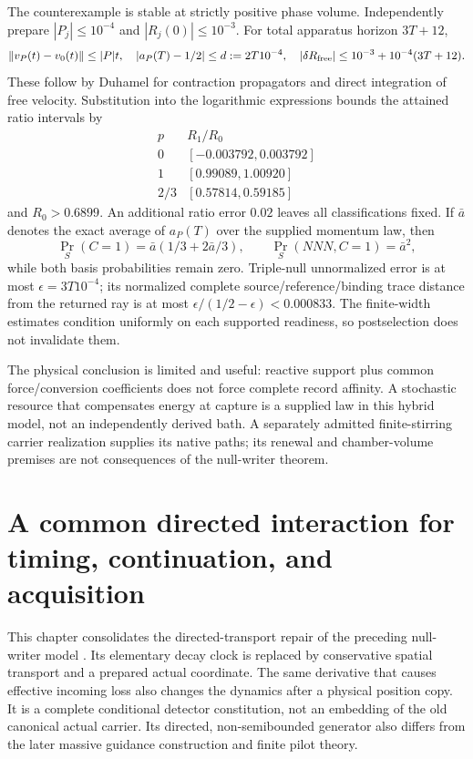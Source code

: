 \documentclass[11pt,oneside,openany]{book}
\theoremstyle{definition}
\theoremstyle{remark}\newtheorem{remark}[theorem]{Remark}
\begin{document}
The counterexample is stable at strictly positive phase volume. Independently prepare $|P_j|\le10^{-4}$ and $|R_j(0)|\le10^{-3}$. For total apparatus horizon $3T+12$,
\[
 \|v_P(t)-v_0(t)\|\le|P|t,\quad
 |a_P(T)-1/2|\le d:=2T10^{-4},\quad
 |\delta R_{\rm free}|\le10^{-3}+10^{-4}(3T+12).
\]
These follow by Duhamel for contraction propagators and direct integration of free velocity. Substitution into the logarithmic expressions bounds the attained ratio intervals by
\[
 \begin{array}{c|c}
 p& R_1/R_0\\\hline
 0&[-0.003792,0.003792]\\
 1&[0.99089,1.00920]\\
 2/3&[0.57814,0.59185]
 \end{array}
\]
and $R_0>0.6899$. An additional ratio error $0.02$ leaves all classifications fixed. If $\bar a$ denotes the exact average of $a_P(T)$ over the supplied momentum law, then
\begin{equation}
 \Pr_S(C=1)=\bar a(1/3+2\bar a/3),\qquad
 \Pr_S(NNN,C=1)=\bar a^2,
 \label{mat:positivewidth}
\end{equation}
while both basis probabilities remain zero. Triple-null unnormalized error is at most $\epsilon=3T10^{-4}$; its normalized complete source/reference/binding trace distance from the returned ray is at most $\epsilon/(1/2-\epsilon)<0.000833$. The finite-width estimates condition uniformly on each supported readiness, so postselection does not invalidate them.

The physical conclusion is limited and useful: reactive support plus common force/conversion coefficients does not force complete record affinity. A stochastic resource that compensates energy at capture is a supplied law in this hybrid model, not an independently derived bath. A separately admitted finite-stirring carrier realization \cite{M27} supplies its native paths; its renewal and chamber-volume premises are not consequences of the null-writer theorem.

\chapter[Directed transport and physical acquisition]{A common directed interaction for timing, continuation, and acquisition}
\label{mat:chiralchapter}

This chapter consolidates the directed-transport repair of the preceding null-writer model \cite{M29}. Its elementary decay clock is replaced by conservative spatial transport and a prepared actual coordinate. The same derivative that causes effective incoming loss also changes the dynamics after a physical position copy. It is a complete conditional detector constitution, not an embedding of the old canonical actual carrier. Its directed, non-semibounded generator also differs from the later massive guidance construction and finite pilot theory.
\end{document}
